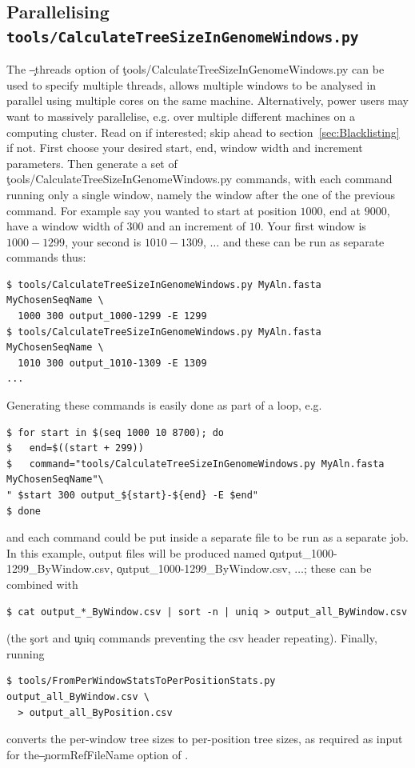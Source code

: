 \subsection{Parallelising \texttt{tools/CalculateTreeSizeInGenomeWindows.py}}
The \c{--threads} option of \c{tools/CalculateTreeSizeInGenomeWindows.py} can be used to specify multiple threads, allows multiple windows to be analysed in parallel using multiple cores on the same machine.
Alternatively, power users may want to massively parallelise, e.g. over multiple different machines on a computing cluster.
Read on if interested; skip ahead to section~\ref{sec:Blacklisting} if not.
First choose your desired start, end, window width and increment parameters.
Then generate a set of \\\c{tools/CalculateTreeSizeInGenomeWindows.py} commands, with each command running only a single window, namely the window after the one of the previous command.
For example say you wanted to start at position $1000$, end at $9000$, have a window width of $300$ and an increment of $10$.
Your first window is $1000-1299$, your second is $1010-1309$, $\ldots$ and these can be run as separate commands thus:
\begin{verbatim}
$ tools/CalculateTreeSizeInGenomeWindows.py MyAln.fasta MyChosenSeqName \
  1000 300 output_1000-1299 -E 1299
$ tools/CalculateTreeSizeInGenomeWindows.py MyAln.fasta MyChosenSeqName \
  1010 300 output_1010-1309 -E 1309
...
\end{verbatim}
Generating these commands is easily done as part of a loop, e.g.
\begin{verbatim}
$ for start in $(seq 1000 10 8700); do
$   end=$((start + 299))
$   command="tools/CalculateTreeSizeInGenomeWindows.py MyAln.fasta MyChosenSeqName"\
" $start 300 output_${start}-${end} -E $end"
$ done
\end{verbatim}
and each command could be put inside a separate file to be run as a separate job.
In this example, output files will be produced named \c{output\_1000-1299\_ByWindow.csv}, \c{output\_1000-1299\_ByWindow.csv}, $\ldots$; these can be combined with
\begin{verbatim}
$ cat output_*_ByWindow.csv | sort -n | uniq > output_all_ByWindow.csv 
\end{verbatim}
(the \c{sort} and \c{uniq} commands preventing the csv header repeating).
Finally, running
\begin{verbatim}
$ tools/FromPerWindowStatsToPerPositionStats.py output_all_ByWindow.csv \
  > output_all_ByPosition.csv
\end{verbatim}
converts the per-window tree sizes to per-position tree sizes, as required as input for the\break \c{--normRefFileName} option of \pat.

